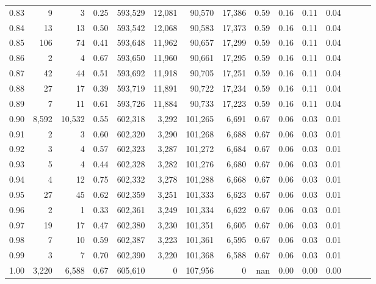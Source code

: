 \begin{tabular}{rrrrrrrrrrrrrrr}
0.83 &       9 &       3 &  0.25 &  593,529 &   12,081 &   90,570 &   17,386 &  0.59 &  0.16 &  0.11 &      0.04 \\
0.84 &      13 &      13 &  0.50 &  593,542 &   12,068 &   90,583 &   17,373 &  0.59 &  0.16 &  0.11 &      0.04 \\
0.85 &     106 &      74 &  0.41 &  593,648 &   11,962 &   90,657 &   17,299 &  0.59 &  0.16 &  0.11 &      0.04 \\
0.86 &       2 &       4 &  0.67 &  593,650 &   11,960 &   90,661 &   17,295 &  0.59 &  0.16 &  0.11 &      0.04 \\
0.87 &      42 &      44 &  0.51 &  593,692 &   11,918 &   90,705 &   17,251 &  0.59 &  0.16 &  0.11 &      0.04 \\
0.88 &      27 &      17 &  0.39 &  593,719 &   11,891 &   90,722 &   17,234 &  0.59 &  0.16 &  0.11 &      0.04 \\
0.89 &       7 &      11 &  0.61 &  593,726 &   11,884 &   90,733 &   17,223 &  0.59 &  0.16 &  0.11 &      0.04 \\
0.90 &   8,592 &  10,532 &  0.55 &  602,318 &    3,292 &  101,265 &    6,691 &  0.67 &  0.06 &  0.03 &      0.01 \\
0.91 &       2 &       3 &  0.60 &  602,320 &    3,290 &  101,268 &    6,688 &  0.67 &  0.06 &  0.03 &      0.01 \\
0.92 &       3 &       4 &  0.57 &  602,323 &    3,287 &  101,272 &    6,684 &  0.67 &  0.06 &  0.03 &      0.01 \\
0.93 &       5 &       4 &  0.44 &  602,328 &    3,282 &  101,276 &    6,680 &  0.67 &  0.06 &  0.03 &      0.01 \\
0.94 &       4 &      12 &  0.75 &  602,332 &    3,278 &  101,288 &    6,668 &  0.67 &  0.06 &  0.03 &      0.01 \\
0.95 &      27 &      45 &  0.62 &  602,359 &    3,251 &  101,333 &    6,623 &  0.67 &  0.06 &  0.03 &      0.01 \\
0.96 &       2 &       1 &  0.33 &  602,361 &    3,249 &  101,334 &    6,622 &  0.67 &  0.06 &  0.03 &      0.01 \\
0.97 &      19 &      17 &  0.47 &  602,380 &    3,230 &  101,351 &    6,605 &  0.67 &  0.06 &  0.03 &      0.01 \\
0.98 &       7 &      10 &  0.59 &  602,387 &    3,223 &  101,361 &    6,595 &  0.67 &  0.06 &  0.03 &      0.01 \\
0.99 &       3 &       7 &  0.70 &  602,390 &    3,220 &  101,368 &    6,588 &  0.67 &  0.06 &  0.03 &      0.01 \\
1.00 &   3,220 &   6,588 &  0.67 &  605,610 &        0 &  107,956 &        0 &   nan &  0.00 &  0.00 &      0.00 \\
\bottomrule
\end{tabular}
